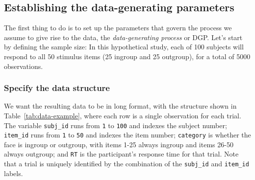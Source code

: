 \documentclass[
  english,
  doc,floatsintext]{apa6}
\begin{document}
\hypertarget{establishing-the-data-generating-parameters}{%
\subsection{Establishing the data-generating parameters}\label{establishing-the-data-generating-parameters}}

The first thing to do is to set up the parameters that govern the process we assume to give rise to the data, the \emph{data-generating process} or DGP. Let's start by defining the sample size: In this hypothetical study, each of 100 subjects will respond to all 50 stimulus items (25 ingroup and 25 outgroup), for a total of 5000 observations.

\hypertarget{specify-the-data-structure}{%
\subsubsection{Specify the data structure}\label{specify-the-data-structure}}

\setcounter{table}{0} \renewcommand{\thetable}{\arabic{table}}

We want the resulting data to be in long format, with the structure shown in Table~\ref{tab:data-example}, where each row is a single observation for each trial. The variable \texttt{subj\_id} runs from \texttt{1} to \texttt{100} and indexes the subject number; \texttt{item\_id} runs from \texttt{1} to \texttt{50} and indexes the item number; \texttt{category} is whether the face is ingroup or outgroup, with items 1-25 always ingroup and items 26-50 always outgroup; and \texttt{RT} is the participant's response time for that trial. Note that a trial is uniquely identified by the combination of the \texttt{subj\_id} and \texttt{item\_id} labels.
\end{document}
